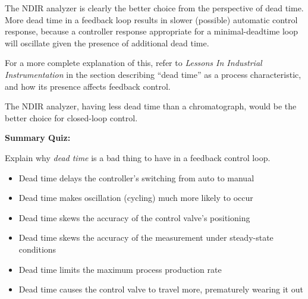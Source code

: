 





The NDIR analyzer is clearly the better choice from the perspective of dead time.  More dead time in a feedback loop results in slower (possible) automatic control response, because a controller response appropriate for a minimal-deadtime loop will oscillate given the presence of additional dead time.

For a more complete explanation of this, refer to {\it Lessons In Industrial Instrumentation} in the section describing ``dead time'' as a process characteristic, and how its presence affects feedback control.







The NDIR analyzer, having less dead time than a chromatograph, would be the better choice for closed-loop control.

\vfil \eject

\noindent
{\bf Summary Quiz:}

Explain why {\it dead time} is a bad thing to have in a feedback control loop.

\begin{itemize}
\item{} Dead time delays the controller's switching from auto to manual
\vskip 5pt 
\item{} Dead time makes oscillation (cycling) much more likely to occur
\vskip 5pt 
\item{} Dead time skews the accuracy of the control valve's positioning
\vskip 5pt 
\item{} Dead time skews the accuracy of the measurement under steady-state conditions
\vskip 5pt 
\item{} Dead time limits the maximum process production rate 
\vskip 5pt 
\item{} Dead time causes the control valve to travel more, prematurely wearing it out
\end{itemize}





